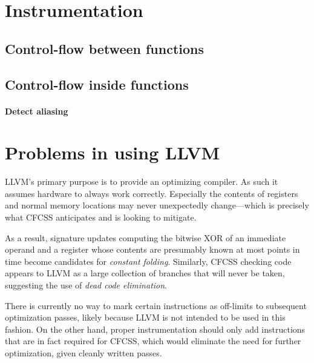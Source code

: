 

\section{Instrumentation}


\subsection{Control-flow between functions}


\subsection{Control-flow inside functions}


\paragraph{Detect aliasing}


\section{Problems in using LLVM}

LLVM's primary purpose is to provide an optimizing compiler. As such it assumes
hardware to always work correctly. Especially the contents of registers and
normal memory locations may never unexpectedly change—which is precisely what
CFCSS anticipates and is looking to mitigate.

As a result, signature updates computing the bitwise XOR of an immediate
operand and a register whose contents are presumably known at most points in
time become candidates for \emph{constant folding}. Similarly, CFCSS checking
code appears to LLVM as a large collection of branches that will never be
taken, suggesting the use of \emph{dead code elimination}.

There is currently no way to mark certain instructions as off-limits to
subsequent optimization passes, likely because LLVM is not intended to be used
in this fashion. On the other hand, proper instrumentation should only add
instructions that are in fact required for CFCSS, which would eliminate the
need for further optimization, given cleanly written passes.


